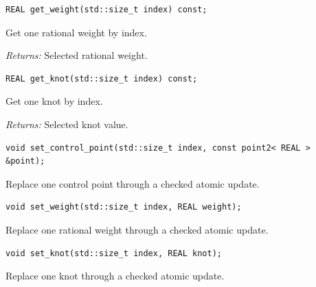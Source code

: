 \par\noindent\begin{minipage}{\linewidth}
\begin{lstlisting}[style=apireference]
REAL get_weight(std::size_t index) const;
\end{lstlisting}
{\footnotesize Get one rational weight by index.\par}
{\footnotesize\textit{Returns:} Selected rational weight.\par}
\end{minipage}\par\vspace{1pt}
\par\noindent\begin{minipage}{\linewidth}
\begin{lstlisting}[style=apireference]
REAL get_knot(std::size_t index) const;
\end{lstlisting}
{\footnotesize Get one knot by index.\par}
{\footnotesize\textit{Returns:} Selected knot value.\par}
\end{minipage}\par\vspace{1pt}
\par\noindent\begin{minipage}{\linewidth}
\begin{lstlisting}[style=apireference]
void set_control_point(std::size_t index, const point2< REAL > &point);
\end{lstlisting}
{\footnotesize Replace one control point through a checked atomic update.\par}
\end{minipage}\par\vspace{1pt}
\par\noindent\begin{minipage}{\linewidth}
\begin{lstlisting}[style=apireference]
void set_weight(std::size_t index, REAL weight);
\end{lstlisting}
{\footnotesize Replace one rational weight through a checked atomic update.\par}
\end{minipage}\par\vspace{1pt}
\par\noindent\begin{minipage}{\linewidth}
\begin{lstlisting}[style=apireference]
void set_knot(std::size_t index, REAL knot);
\end{lstlisting}
{\footnotesize Replace one knot through a checked atomic update.\par}
\end{minipage}\par\vspace{1pt}
